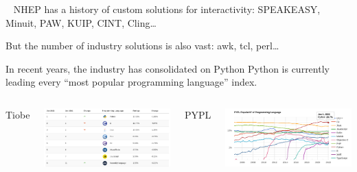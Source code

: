 \documentclass[aspectratio=169]{beamer}
\begin{document}
\begin{frame}{\mbox{ }}
\vspace{0.5 cm}
\Large
NHEP has a history of custom solutions for interactivity: SPEAKEASY, Minuit, PAW, KUIP, CINT, Cling\ldots

\vspace{1 cm}
But the number of industry solutions is also vast: awk, tcl, perl\ldots
\end{frame}

\begin{frame}{In recent years, the industry has consolidated on Python}
\large
\vspace{0.25 cm}
Python is currently leading every ``most popular programming language'' index.

\vspace{0.25 cm}
\begin{columns}[t]
\centering Tiobe

\vspace{0.1 cm}
\includegraphics[width=\linewidth]{PLOTS/python-rankings-tiobe-2022.png}

\centering PYPL

\vspace{0.1 cm}
\includegraphics[width=\linewidth]{PLOTS/python-rankings-pypl-2022.png}


\end{columns}
\end{frame}
\end{document}
